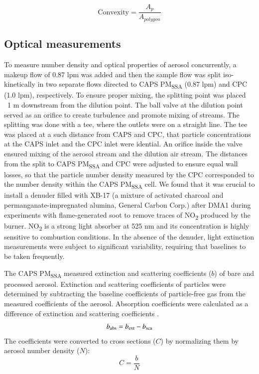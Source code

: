 \begin{equation}
    \mathrm{Convexity}=\frac{A_p}{A_{polygon}}
    \label{eq:convexity}
\end{equation}

\subsection{Optical measurements}

To measure number density and optical properties of aerosol concurrently, a makeup flow of 0.87 lpm was added and then the sample flow was split iso-kinetically in two separate flows directed to CAPS PM\textsubscript{SSA} (0.87 lpm) and CPC (1.0 lpm), respectively. To ensure proper mixing, the splitting point was placed ~1 m downstream from the dilution point. The ball valve at the dilution point served as an orifice to create turbulence and promote mixing of streams. The splitting was done with a tee, where the outlets were on a straight line. The tee was placed at a such distance from CAPS and CPC, that particle concentrations at the CAPS inlet and the CPC inlet were idential. An orifice inside the valve ensured mixing of the aerosol stream and the dilution air stream. The distances from the split to CAPS PM\textsubscript{SSA} and CPC were adjusted to ensure equal wall losses, so that the particle number density measured by the CPC corresponded to the number density within the CAPS PM\textsubscript{SSA} cell. We found that it was crucial to install a denuder filled with XB-17 (a mixture of activated charcoal and permanganate-impregnated alumina, General Carbon Corp.) after DMA1 during experiments with flame-generated soot to remove traces of NO\textsubscript{2} produced by the burner. NO\textsubscript{2} is a strong light absorber at 525 nm and its concentration is highly sensitive to combustion conditions. In the absence of the denuder, light extinction measurements were subject to significant variability, requiring that baselines to be taken frequently.

The CAPS PM\textsubscript{SSA} measured extinction and scattering coefficients ($b$) of bare and processed aerosol. Extinction and scattering coefficients of particles were determined by subtracting the baseline coefficients of particle-free gas from the measured coefficients of the aerosol. Absorption coefficients were calculated as a difference of extinction and scattering coefficients \citep{RN7,RN50}.
\begin{equation}
b_{\rm abs}=b_{\rm ext}-b_{\rm sca}
\label{eq:babs}
\end{equation}
The coefficients were converted to cross sections ($C$) by normalizing them by aerosol number density ($N$):
\begin{equation}
C=\frac{b}{N}
\label{eq:copt}
\end{equation}


